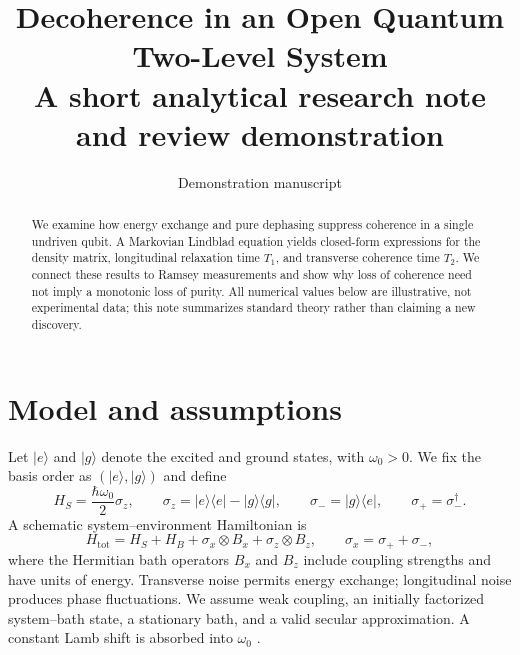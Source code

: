 \documentclass[10pt,a4paper]{article}
\title{Decoherence in an Open Quantum Two-Level System\\
\large A short analytical research note and review demonstration}
\author{Demonstration manuscript}
\date{}
\newcommand{\ket}[1]{\lvert #1\rangle}
\newcommand{\bra}[1]{\langle #1\rvert}
\begin{document}
\maketitle

\begin{abstract}
We examine how energy exchange and pure dephasing suppress coherence in a
single undriven qubit. A Markovian Lindblad equation yields closed-form
expressions for the density matrix, longitudinal relaxation time $T_1$,
and transverse coherence time $T_2$. We connect these results to Ramsey
measurements and show why loss of coherence need not imply a monotonic
loss of purity. All numerical values below are illustrative, not
experimental data; this note summarizes standard theory rather than
claiming a new discovery.
\end{abstract}

\section{Model and assumptions}

Let $\ket{e}$ and $\ket{g}$ denote the excited and ground states, with
$\omega_0>0$. We fix the basis order as $(\ket{e},\ket{g})$ and define
\begin{equation}
 H_S=\frac{\hbar\omega_0}{2}\sigma_z,\qquad
 \sigma_z=\ket{e}\bra{e}-\ket{g}\bra{g},\qquad
 \sigma_-=\ket{g}\bra{e},\qquad \sigma_+=\sigma_-^\dagger.
 \label{eq:hamiltonian}
\end{equation}
A schematic system--environment Hamiltonian is
\begin{equation}
 H_{\mathrm{tot}}=H_S+H_B+
 \sigma_x\otimes B_x+\sigma_z\otimes B_z,
 \qquad \sigma_x=\sigma_++\sigma_-,
 \label{eq:interaction}
\end{equation}
where the Hermitian bath operators $B_x$ and $B_z$ include coupling
strengths and have units of energy. Transverse noise permits energy
exchange; longitudinal noise produces phase fluctuations. We assume
weak coupling, an initially factorized system--bath state, a stationary
bath, and a valid secular approximation. A constant Lamb shift is
absorbed into $\omega_0$ \cite{breuer}.
\end{document}

